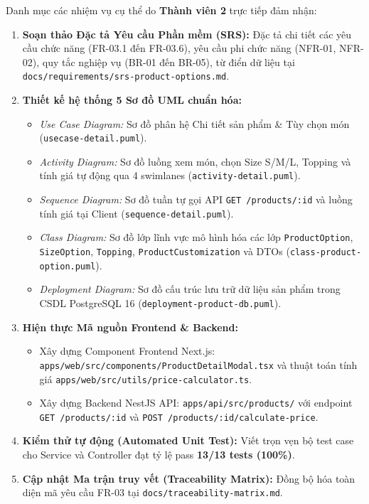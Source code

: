 \documentclass[a4paper]{article}
\begin{document}
Danh mục các nhiệm vụ cụ thể do \textbf{Thành viên 2} trực tiếp đảm nhận:
\begin{enumerate}
    \item \textbf{Soạn thảo Đặc tả Yêu cầu Phần mềm (SRS):} Đặc tả chi tiết các yêu cầu chức năng (FR-03.1 đến FR-03.6), yêu cầu phi chức năng (NFR-01, NFR-02), quy tắc nghiệp vụ (BR-01 đến BR-05), từ điển dữ liệu tại \nolinkurl{docs/requirements/srs-product-options.md}.
    \item \textbf{Thiết kế hệ thống 5 Sơ đồ UML chuẩn hóa:}
    \begin{itemize}
        \item \textit{Use Case Diagram:} Sơ đồ phân hệ Chi tiết sản phẩm \& Tùy chọn món (\nolinkurl{usecase-detail.puml}).
        \item \textit{Activity Diagram:} Sơ đồ luồng xem món, chọn Size S/M/L, Topping và tính giá tự động qua 4 swimlanes (\nolinkurl{activity-detail.puml}).
        \item \textit{Sequence Diagram:} Sơ đồ tuần tự gọi API \texttt{GET /products/:id} và luồng tính giá tại Client (\nolinkurl{sequence-detail.puml}).
        \item \textit{Class Diagram:} Sơ đồ lớp lĩnh vực mô hình hóa các lớp \texttt{ProductOption}, \texttt{SizeOption}, \texttt{Topping}, \texttt{ProductCustomization} và DTOs (\nolinkurl{class-product-option.puml}).
        \item \textit{Deployment Diagram:} Sơ đồ cấu trúc lưu trữ dữ liệu sản phẩm trong CSDL PostgreSQL 16 (\nolinkurl{deployment-product-db.puml}).
    \end{itemize}
    \item \textbf{Hiện thực Mã nguồn Frontend \& Backend:}
    \begin{itemize}
        \item Xây dựng Component Frontend Next.js: \nolinkurl{apps/web/src/components/ProductDetailModal.tsx} và thuật toán tính giá \nolinkurl{apps/web/src/utils/price-calculator.ts}.
        \item Xây dựng Backend NestJS API: \nolinkurl{apps/api/src/products/} với endpoint \texttt{GET /products/:id} và \texttt{POST /products/:id/calculate-price}.
    \end{itemize}
    \item \textbf{Kiểm thử tự động (Automated Unit Test):} Viết trọn vẹn bộ test case cho Service và Controller đạt tỷ lệ pass \textbf{13/13 tests (100\%)}.
    \item \textbf{Cập nhật Ma trận truy vết (Traceability Matrix):} Đồng bộ hóa toàn diện mã yêu cầu FR-03 tại \nolinkurl{docs/traceability-matrix.md}.
\end{enumerate}
\end{document}
